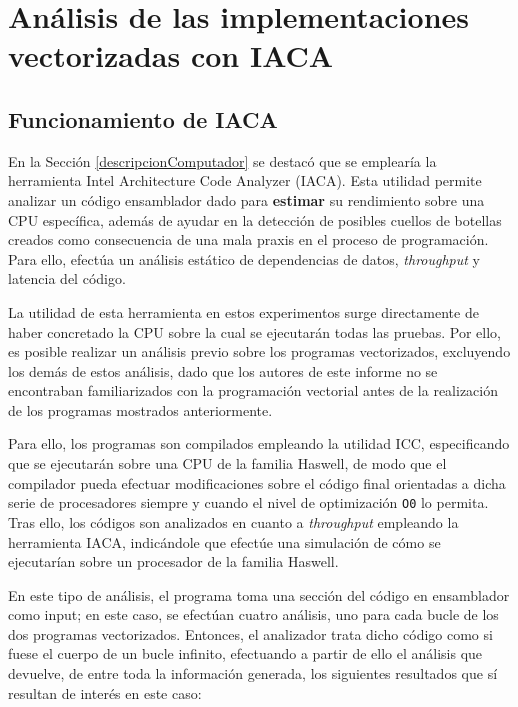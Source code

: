 \documentclass[conference]{IEEEtran}
\begin{document}
\section{Análisis de las implementaciones vectorizadas con IACA}\label{IACA}

\subsection{Funcionamiento de IACA}

En la Sección \ref{descripcionComputador} se destacó que se emplearía la herramienta Intel Architecture Code Analyzer (IACA). Esta utilidad permite analizar un código ensamblador dado para \textbf{estimar} su rendimiento sobre una CPU específica, además de ayudar en la detección de posibles cuellos de botellas creados como consecuencia de una mala praxis en el proceso de programación. Para ello, efectúa un análisis estático de dependencias de datos, \textit{throughput} y latencia del código.

La utilidad de esta herramienta en estos experimentos surge directamente de haber concretado la CPU sobre la cual se ejecutarán todas las pruebas. Por ello, es posible realizar un análisis previo sobre los programas vectorizados, excluyendo los demás de estos análisis, dado que los autores de este informe no se encontraban familiarizados con la programación vectorial antes de la realización de los programas mostrados anteriormente. 

Para ello, los programas son compilados empleando la utilidad ICC, especificando que se ejecutarán sobre una CPU de la familia Haswell, de modo que el compilador pueda efectuar modificaciones sobre el código final orientadas a dicha serie de procesadores siempre y cuando el nivel de optimización \texttt{O0} lo permita. Tras ello, los códigos son analizados en cuanto a \textit{throughput} empleando la herramienta IACA, indicándole que efectúe una simulación de cómo se ejecutarían sobre un procesador de la familia Haswell.

En este tipo de análisis, el programa toma una sección del código en ensamblador como input; en este caso, se efectúan cuatro análisis, uno para cada bucle de los dos programas vectorizados. Entonces, el analizador trata dicho código como si fuese el cuerpo de un bucle infinito, efectuando a partir de ello el análisis que devuelve, de entre toda la información generada, los siguientes resultados que sí resultan de interés en este caso:
\end{document}
